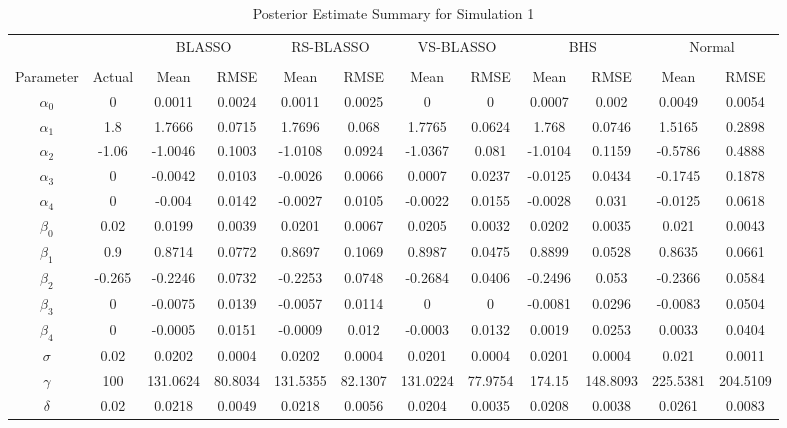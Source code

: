\begin{table}[!h]
	\tiny
  \centering
  \caption{Posterior Estimate Summary for Simulation 1}
    \begin{tabular}{cccccccccccc}
    \toprule
   & & \multicolumn{2}{c}{BLASSO} &\multicolumn{2}{c}{RS-BLASSO} &\multicolumn{2}{c}{VS-BLASSO}  & \multicolumn{2}{c}{BHS} & \multicolumn{2}{c}{Normal} \\
    \cline{3-4} \cline{5-6} \cline{7-8} \cline{9-10} \cline{11-12}\\
    Parameter & Actual & Mean  & RMSE &  Mean & RMSE & Mean & RMSE & Mean & RMSE & Mean & RMSE   \\
    \midrule
   $\alpha_0$ & 0    & 0.0011 & 0.0024 & 0.0011 & 0.0025 & 0    & 0    & 0.0007 & 0.002 & 0.0049 & 0.0054 \\
    $\alpha_1$ & 1.8  & 1.7666 & 0.0715 & 1.7696 & 0.068 & 1.7765 & 0.0624 & 1.768 & 0.0746 & 1.5165 & 0.2898 \\
    $\alpha_2$ & -1.06 & -1.0046 & 0.1003 & -1.0108 & 0.0924 & -1.0367 & 0.081 & -1.0104 & 0.1159 & -0.5786 & 0.4888 \\
    $\alpha_3$ & 0    & -0.0042 & 0.0103 & -0.0026 & 0.0066 & 0.0007 & 0.0237 & -0.0125 & 0.0434 & -0.1745 & 0.1878 \\
    $\alpha_4$ & 0    & -0.004 & 0.0142 & -0.0027 & 0.0105 & -0.0022 & 0.0155 & -0.0028 & 0.031 & -0.0125 & 0.0618 \\
    $\beta_0$ & 0.02 & 0.0199 & 0.0039 & 0.0201 & 0.0067 & 0.0205 & 0.0032 & 0.0202 & 0.0035 & 0.021 & 0.0043 \\
    $\beta_1$ & 0.9  & 0.8714 & 0.0772 & 0.8697 & 0.1069 & 0.8987 & 0.0475 & 0.8899 & 0.0528 & 0.8635 & 0.0661 \\
    $\beta_2$ & -0.265 & -0.2246 & 0.0732 & -0.2253 & 0.0748 & -0.2684 & 0.0406 & -0.2496 & 0.053 & -0.2366 & 0.0584 \\
    $\beta_3$ & 0    & -0.0075 & 0.0139 & -0.0057 & 0.0114 & 0    & 0    & -0.0081 & 0.0296 & -0.0083 & 0.0504 \\
    $\beta_4$ & 0    & -0.0005 & 0.0151 & -0.0009 & 0.012 & -0.0003 & 0.0132 & 0.0019 & 0.0253 & 0.0033 & 0.0404 \\
    $\sigma$ & 0.02 & 0.0202 & 0.0004 & 0.0202 & 0.0004 & 0.0201 & 0.0004 & 0.0201 & 0.0004 & 0.021 & 0.0011 \\
    $\gamma$ & 100  & 131.0624 & 80.8034 & 131.5355 & 82.1307 & 131.0224 & 77.9754 & 174.15 & 148.8093 & 225.5381 & 204.5109 \\
    $\delta$ & 0.02 & 0.0218 & 0.0049 & 0.0218 & 0.0056 & 0.0204 & 0.0035 & 0.0208 & 0.0038 & 0.0261 & 0.0083 \\
    \bottomrule
    \end{tabular}%
  \label{tab:blassobhssummary}%
\end{table}%

